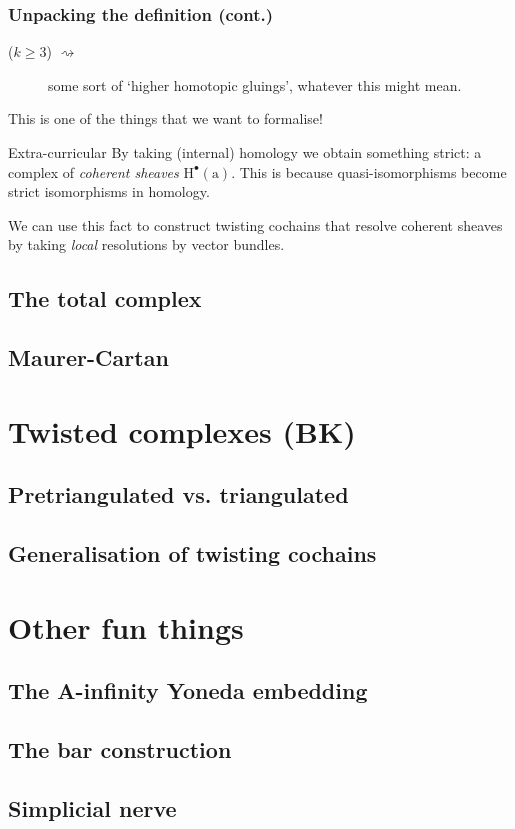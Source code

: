 \documentclass{beamer}
\begin{document}
            \begin{frame}\frametitle{Unpacking the definition (cont.)}
                \begin{description}
                    \item[($k\geqslant3$) $\rightsquigarrow$] some sort of `higher homotopic gluings', whatever this might mean.
                \end{description}

                \pause

                This is one of the things that we want to formalise!

                \pause

                \begin{block}{Extra-curricular}
                    By taking (internal) homology we obtain something strict: a complex of \emph{coherent sheaves} $\mathrm{H}^\bullet(\mathrm{a})$.
                    This is because quasi-isomorphisms become strict isomorphisms in homology.

                    We can use this fact to construct twisting cochains that resolve coherent sheaves by taking \emph{local} resolutions by vector bundles.
                \end{block}
            \end{frame}

        \subsection{The total complex}

        \subsection{Maurer-Cartan}


    \section{Twisted complexes (BK)}
        
        \subsection{Pretriangulated vs. triangulated}
        
        \subsection{Generalisation of twisting cochains}
    

    \section{Other fun things}

        \subsection{The A-infinity Yoneda embedding}
        
        \subsection{The bar construction}
        
        \subsection{Simplicial nerve}
\end{document}
